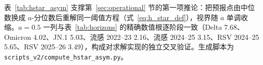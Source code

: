 \documentclass[10pt,UTF8,a4paper,zihao=-4]{ctexart}
\theoremstyle{plain}
\theoremstyle{definition}
\theoremstyle{remark}
\begin{document}
\begin{table}[htbp]
\centering
\footnotesize
\setlength{\tabcolsep}{4pt}
\caption{非对称损失权重 $a$ 下的机制视界 $h^*(a)$（周，$\tau=0.5$，表~\ref{tab:horizons} 中位工作点）}
\label{tab:hstar_asym}

\end{table}

表~\ref{tab:hstar_asym} 支撑第~\ref{sec:operational} 节的第一项推论：把预报点由中位数换成 $a$-分位数后重解同一阈值方程（式~\eqref{eq:h_star_def}），视界随 $a$ 单调收缩。$a=0.5$ 一列与表~\ref{tab:horizons} 的精确数值根逐阶段一致（Delta 7.68、Omicron 4.02、JN.1 5.03、流感 2022--23 2.16、流感 2024--25 3.15、RSV 2024--25 5.65、RSV 2025--26 3.49），构成对求解实现的独立交叉验证。生成脚本为 \texttt{scripts\_v2/compute\_hstar\_asym.py}。

\small


\end{document}
